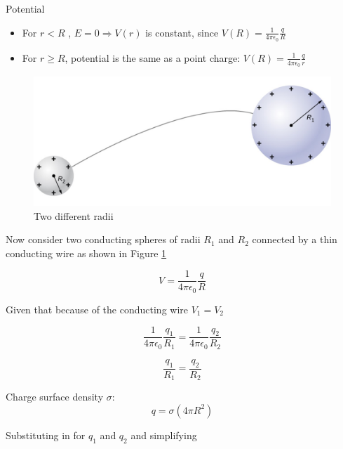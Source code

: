 \documentclass[14pt]{memoir}
\begin{document}
Potential 
\begin{itemize}
\item For $r < R$ , $E = 0 \Rightarrow V(r)$ is constant, since $V(R) = \frac{1}{4 \pi \epsilon_0} \frac{q}{R}$


\item For $r \geq R$, potential is the same as a point charge: $V(R) = \frac{1}{4 \pi \epsilon_0} \frac{q}{r}$
\end{itemize}


\begin{figure}[H]
\begin{center}
\includegraphics[scale=0.50]{fig/fig_07_39.jpg}
\caption{Two different radii}
\label{fig:07_39}
\end{center}
\end{figure}

Now consider two conducting spheres of radii $R_1$ and $R_2$ connected by a thin conducting wire as shown in Figure \ref{fig:07_39}

\begin{equation}
V = \frac{1}{4 \pi \epsilon_0} \frac{q}{R}
\end{equation}

Given that because of the conducting wire $V_1 = V_2$

\begin{equation}
\frac{1}{4 \pi \epsilon_0} \frac{q_1}{R_1} = \frac{1}{4 \pi \epsilon_0} \frac{q_2}{R_2}
\end{equation}

\begin{equation}
\frac{q_1}{R_1} = \frac{q_2}{R_2}
\end{equation}

Charge surface density $\sigma$: 
\begin{equation}
q = \sigma(4 \pi R^2)
\end{equation}

Substituting in for $q_1$ and $q_2$ and simplifying
\end{document}
